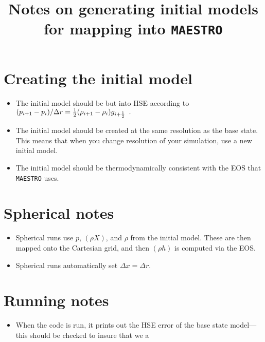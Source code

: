 \documentclass[11pt]{article}
\title{Notes on generating initial models for mapping into {\tt MAESTRO}}
\def\half  {\frac{1}{2}}
\begin{document}
\maketitle
\tableofcontents

\clearpage

\section{Creating the initial model}
\begin{itemize}
\item The initial model should be but into HSE according to 
$(p_{i+1} - p_i)/\Delta r = \half (\rho_{i+1} - \rho_i) g_{i+\half} \enskip .$

\item The initial model should be created at the same resolution as
the base state.  This means that when you change resolution of your
simulation, use a new initial model.

\item The initial model should be thermodynamically consistent with
the EOS that {\tt MAESTRO} uses.

\end{itemize}

\section{Spherical notes}
\begin{itemize}
\item Spherical runs use $p$, $(\rho X)$, and $\rho$ from the initial
model.  These are then mapped onto the Cartesian grid, and then
$(\rho h)$ is computed via the EOS.

\item Spherical runs automatically set $\Delta x = \Delta r$.
\end{itemize}

\section{Running notes}
\begin{itemize}
\item When the code is run, it prints out the HSE error of the base
state model---this should be checked to insure that we a
\end{itemize}
\end{document}
